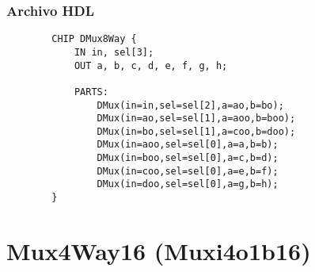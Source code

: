 \documentclass[12pt]{article}
\begin{document}
        \subsubsection{Archivo HDL}
            \begin{lstlisting}
        CHIP DMux8Way {
            IN in, sel[3];
            OUT a, b, c, d, e, f, g, h;
        
            PARTS:
                DMux(in=in,sel=sel[2],a=ao,b=bo);
                DMux(in=ao,sel=sel[1],a=aoo,b=boo);
                DMux(in=bo,sel=sel[1],a=coo,b=doo);
                DMux(in=aoo,sel=sel[0],a=a,b=b);
                DMux(in=boo,sel=sel[0],a=c,b=d);
                DMux(in=coo,sel=sel[0],a=e,b=f);
                DMux(in=doo,sel=sel[0],a=g,b=h);
        }
            \end{lstlisting}
    \newpage


\section{Mux4Way16 (Muxi4o1b16)} \label{mux4waytitle}
\end{document}
